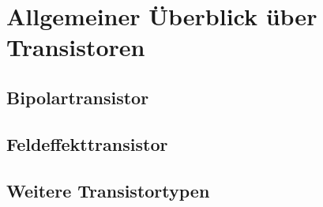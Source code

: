 \section{Allgemeiner Überblick über Transistoren}
\label{cha:allgemeinerueberblickuebertransistoren}

\subsection{Bipolartransistor}
\label{bipolartransistoren}

\subsection{Feldeffekttransistor}
\label{feldeffekttransistoren}

\subsection{Weitere Transistortypen}
\label{weiteretransistortypen}